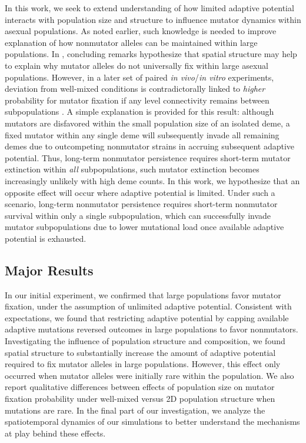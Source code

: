 In this work, we seek to extend understanding of how limited adaptive potential interacts with population size and structure to influence mutator dynamics within asexual populations.
As noted earlier, such knowledge is needed to improve explanation of how nonmutator alleles can be maintained within large populations.
In \citep{raynes2018sign}, concluding remarks hypothesize that spatial structure may help to explain why mutator alleles do not universally fix within large asexual populations.
However, in a later set of paired \textit{in vivo}/\textit{in vitro} experiments, deviation from well-mixed conditions is contradictorally linked to \textit{higher} probability for mutator fixation if any level connectivity remains between subpopulations \citep{raynes2019migration}.
A simple explanation is provided for this result: although mutators are disfavored within the small population size of an isolated deme, a fixed mutator within any single deme will subsequently invade all remaining demes due to outcompeting nonmutator strains in accruing subsequent adaptive potential.
Thus, long-term nonmutator persistence requires short-term mutator extinction within \textit{all} subpopulations, such mutator extinction becomes increasingly unlikely with high deme counts.
In this work, we hypothesize that an opposite effect will occur where adaptive potential is limited.
Under such a scenario, long-term nonmutator persistence requires short-term nonmutator survival within only a single subpopulation, which can successfully invade mutator subpopulations due to lower mutational load once available adaptive potential is exhausted.

\subsection{Major Results}

In our initial experiment, we confirmed that large populations favor mutator fixation, under the assumption of unlimited adaptive potential.
Consistent with expectations, we found that restricting adaptive potential by capping available adaptive mutations reversed outcomes in large populations to favor nonmutators.
Investigating the influence of population structure and composition, we found spatial structure to substantially increase the amount of adaptive potential required to fix mutator alleles in large populations.
However, this effect only occurred when mutator alleles were initially rare within the population.
We also report qualitative differences between effects of population size on mutator fixation probability under well-mixed versus 2D population structure when mutations are rare.
In the final part of our investigation, we analyze the spatiotemporal dynamics of our simulations to better understand the mechanisms at play behind these effects.

